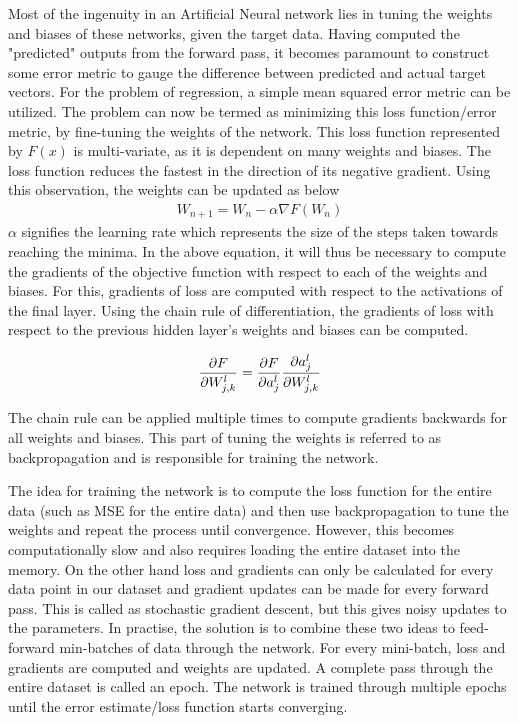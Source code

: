 \documentclass{article}
\begin{document}
Most of the ingenuity in an Artificial Neural network lies in tuning the weights and biases of these networks, given the target data. Having computed the "predicted" outputs from the forward pass, it becomes paramount to construct some error metric to gauge the difference between predicted and actual target vectors. For the problem of regression, a simple mean squared error metric can be utilized. The problem can now be termed as minimizing this loss function/error metric, by fine-tuning the weights of the network. This loss function represented by $F(x)$ is multi-variate, as it is dependent on many weights and biases. The loss function reduces the fastest in the direction of its negative gradient. Using this observation, the weights can be updated as below
\begin{equation}
    \begin{split}
        W_{n+1}=W_n-\alpha\nabla F(W_n)
    \end{split}
\end{equation}
$\alpha$ signifies the learning rate which represents the size of the steps taken towards reaching the minima. In the above equation, it will thus be necessary to compute the gradients of the objective function with respect to each of the weights and biases. For this, gradients of loss are computed with respect to the activations of the final layer. Using the chain rule of differentiation, the gradients of loss with respect to the previous hidden layer's weights and biases can be computed. 

\begin{equation}
    \frac{\partial F}{\partial W^l_{j,k}}=\frac{\partial F}{\partial a^{l}_{j}}\frac{\partial a^{l}_{j}}{\partial W^{l}_{j,k}}\\
\end{equation}

The chain rule can be applied multiple times to compute gradients backwards for all weights and biases. This part of tuning the weights is referred to as backpropagation and is responsible for training the network. 

The idea for training the network is to compute the loss function for the entire data (such as MSE for the entire data) and then use backpropagation to tune the weights and repeat the process until convergence. However, this becomes computationally slow and also requires loading the entire dataset into the memory. On the other hand loss and gradients can only be calculated for every data point in our dataset and gradient updates can be made for every forward pass. This is called as stochastic gradient descent\cite{Robbins&Monro:1951}, but this gives noisy updates to the parameters. In practise, the solution is to combine these two ideas to feed-forward min-batches of data through the network. For every mini-batch, loss and gradients are computed and weights are updated. A complete pass through the entire dataset is called an epoch. The network is trained through multiple epochs until the error estimate/loss function starts converging. 
\end{document}
